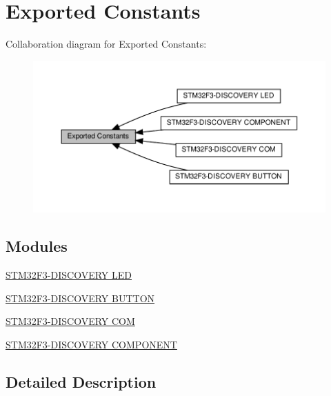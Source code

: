 \hypertarget{group__STM32F3__DISCOVERY__Exported__Constants}{}\section{Exported Constants}
\label{group__STM32F3__DISCOVERY__Exported__Constants}
Collaboration diagram for Exported Constants\+:\nopagebreak
\begin{figure}[H]
\begin{center}
\leavevmode
\includegraphics[width=350pt]{group__STM32F3__DISCOVERY__Exported__Constants}
\end{center}
\end{figure}
\subsection*{Modules}
\begin{DoxyCompactItemize}
\item 
\hyperlink{group__STM32F3__DISCOVERY__LED}{S\+T\+M32\+F3-\/\+D\+I\+S\+C\+O\+V\+E\+R\+Y L\+ED}
\item 
\hyperlink{group__STM32F3__DISCOVERY__BUTTON}{S\+T\+M32\+F3-\/\+D\+I\+S\+C\+O\+V\+E\+R\+Y B\+U\+T\+T\+ON}
\item 
\hyperlink{group__STM32F3__DISCOVERY__COM}{S\+T\+M32\+F3-\/\+D\+I\+S\+C\+O\+V\+E\+R\+Y C\+OM}
\item 
\hyperlink{group__STM32F3__DISCOVERY__COMPONENT}{S\+T\+M32\+F3-\/\+D\+I\+S\+C\+O\+V\+E\+R\+Y C\+O\+M\+P\+O\+N\+E\+NT}
\end{DoxyCompactItemize}


\subsection{Detailed Description}
